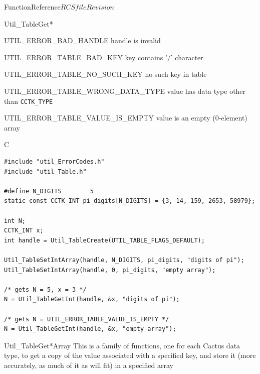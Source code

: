\begin{cactuspart}{FunctionReference}{$RCSfile$}{$Revision$}
\begin{FunctionDescription}{Util\_TableGet*}
\begin{ErrorSection}
\begin{Error}{UTIL\_ERROR\_BAD\_HANDLE}
handle is invalid
\end{Error}
\begin{Error}{UTIL\_ERROR\_TABLE\_BAD\_KEY}
key contains '/' character
\end{Error}
\begin{Error}{UTIL\_ERROR\_TABLE\_NO\_SUCH\_KEY}
no such key in table
\end{Error}
\begin{Error}{UTIL\_ERROR\_TABLE\_WRONG\_DATA\_TYPE}
value has data type other than \verb|CCTK_TYPE|
\end{Error}
\begin{Error}{UTIL\_ERROR\_TABLE\_VALUE\_IS\_EMPTY}
value is an empty (0-element) array
\end{Error}
\end{ErrorSection}

\begin{ExampleSection}
\begin{Example}{C}
\begin{verbatim}
#include "util_ErrorCodes.h"
#include "util_Table.h"

#define N_DIGITS        5
static const CCTK_INT pi_digits[N_DIGITS] = {3, 14, 159, 2653, 58979};

int N;
CCTK_INT x;
int handle = Util_TableCreate(UTIL_TABLE_FLAGS_DEFAULT);

Util_TableSetIntArray(handle, N_DIGITS, pi_digits, "digits of pi");
Util_TableSetIntArray(handle, 0, pi_digits, "empty array");

/* gets N = 5, x = 3 */
N = Util_TableGetInt(handle, &x, "digits of pi");

/* gets N = UTIL_ERROR_TABLE_VALUE_IS_EMPTY */
N = Util_TableGetInt(handle, &x, "empty array");
\end{verbatim}
\end{Example}
\end{ExampleSection}
\end{FunctionDescription}


\begin{FunctionDescription}{Util\_TableGet*Array}
\label{Util-TableGet*Array}
This is a family of functions, one for each Cactus data type,
to get a copy of the value associated with a specified key, and store
it (more accurately, as much of it as will fit) in a specified array


\end{FunctionDescription}
\end{cactuspart}
